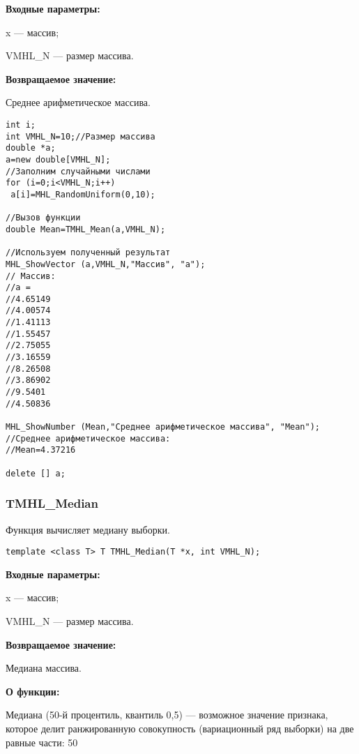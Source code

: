\documentclass[a4paper,12pt]{article}
\begin{document}
\textbf{Входные параметры:}

 x --- массив;
 
 VMHL\_N --- размер массива.

\textbf{Возвращаемое значение:}

 Среднее арифметическое массива.



\begin{lstlisting}[label=code_use_TMHL_Mean,caption=Пример использования]
int i;
int VMHL_N=10;//Размер массива
double *a;
a=new double[VMHL_N];
//Заполним случайными числами
for (i=0;i<VMHL_N;i++)
 a[i]=MHL_RandomUniform(0,10);

//Вызов функции
double Mean=TMHL_Mean(a,VMHL_N);

//Используем полученный результат
MHL_ShowVector (a,VMHL_N,"Массив", "a");
// Массив:
//a =
//4.65149
//4.00574
//1.41113
//1.55457
//2.75055
//3.16559
//8.26508
//3.86902
//9.5401
//4.50836

MHL_ShowNumber (Mean,"Среднее арифметическое массива", "Mean");
//Среднее арифметическое массива:
//Mean=4.37216

delete [] a;
\end{lstlisting}

\subsubsection{TMHL\_Median}\label{TMHL_Median}

Функция вычисляет медиану выборки.


\begin{lstlisting}[label=code_syntax_TMHL_Median,caption=Синтаксис]
template <class T> T TMHL_Median(T *x, int VMHL_N);
\end{lstlisting}

\textbf{Входные параметры:}

 x --- массив;
 
 VMHL\_N --- размер массива.

\textbf{Возвращаемое значение:}

 Медиана массива.
 
\textbf{ О функции:}

Медиана (50-й процентиль, квантиль 0,5) — возможное значение признака, которое делит ранжированную совокупность (вариационный ряд выборки) на две равные части: 50 %
\end{document}
